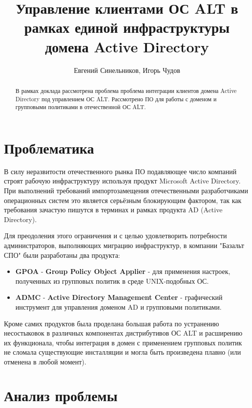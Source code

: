 \author{Евгений Синельников, Игорь Чудов}
\title{Управление клиентами ОС ALT в рамках единой инфраструктуры
домена Active Directory}
\maketitle

\begin{abstract}
  В рамках доклада рассмотрена проблема проблема интеграции клиентов
  домена Active Directory под управлением ОС ALT. Рассмотрено ПО для
  работы с доменом и групповыми политиками в отечественной ОС ALT.
\end{abstract}


\section{Проблематика}

В силу неразвитости отечественного рынка ПО подавляющее число компаний
строят рабочую инфраструктуру используя продукт Microsoft Active
Directory. При выполнений требований импортозамещения отечественными
разработчиками операционных систем это является серьёзным блокирующим
фактором, так как требования зачастую пишутся в терминах и рамках
продукта AD (Active Directory).

Для преодоления этого ограничения и с целью удовлетворить потребности
администраторов, выполняющих миграцию инфраструктур, в компании
"Базальт СПО" были разработаны два продукта:

\begin{itemize}
\item \textbf{GPOA} - \textbf{Group Policy Object Applier} - для применения
настроек, полученных из групповых политик в среде UNIX-подобных ОС.
\item \textbf{ADMC} - \textbf{Active Directory Management Center} -
графический инструмент для управления доменом AD и групповыми политиками.
\end{itemize}

Кроме самих продуктов была проделана большая работа по устранению
несостыковок в различных компонентах дистрибутивов ОС ALT и расширению
их функционала, чтобы интеграция в домен с применением групповых
политик не сломала существующие инсталляции и могла быть произведена
плавно (или отменена в любой момент).

\section{Анализ проблемы}

